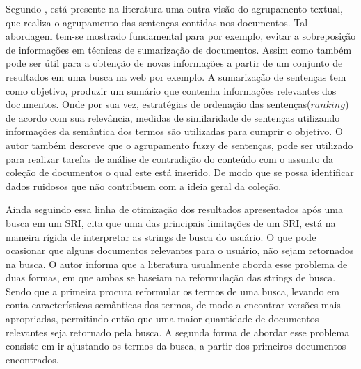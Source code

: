 Segundo \cite{Saranya2014}, está presente na literatura uma outra visão do agrupamento textual, que
realiza o agrupamento das sentenças contidas nos documentos. Tal abordagem tem-se mostrado 
fundamental para por exemplo, evitar a sobreposição de informações em técnicas de sumarização de 
documentos. Assim como também
pode ser útil para a obtenção de novas informações a partir de um conjunto de resultados em uma
busca na web por exemplo. A sumarização de sentenças tem como objetivo, produzir um sumário que
contenha informações relevantes dos documentos. Onde por sua vez, estratégias de ordenação das
sentenças($ranking$) de acordo com sua relevância, medidas de similaridade de sentenças utilizando
informações da semântica dos termos são utilizadas para cumprir o objetivo. O autor também 
descreve que o agrupamento fuzzy de sentenças, pode ser utilizado para realizar
tarefas de análise de contradição do conteúdo com o assunto da coleção de documentos o qual este
está inserido. De modo que se possa identificar dados ruidosos que não contribuem com a ideia geral
da coleção.

Ainda seguindo essa linha de otimização dos resultados apresentados após uma busca em um SRI,
\cite{Nogueira2012} cita que uma das principais limitações de um SRI, está na maneira rígida de
interpretar as strings de busca do usuário. O que pode ocasionar que alguns documentos relevantes
para o usuário, não sejam retornados na busca. O autor informa que a literatura usualmente aborda
esse problema de duas formas, em que ambas se baseiam na reformulação das strings de busca. Sendo
que a primeira procura reformular os termos de uma busca, levando em conta características
semânticas dos termos, de modo a encontrar versões mais apropriadas, permitindo então que uma maior
quantidade de documentos relevantes seja retornado pela busca. A segunda forma de abordar esse
problema consiste em ir ajustando os termos da busca, a partir dos primeiros documentos encontrados.

